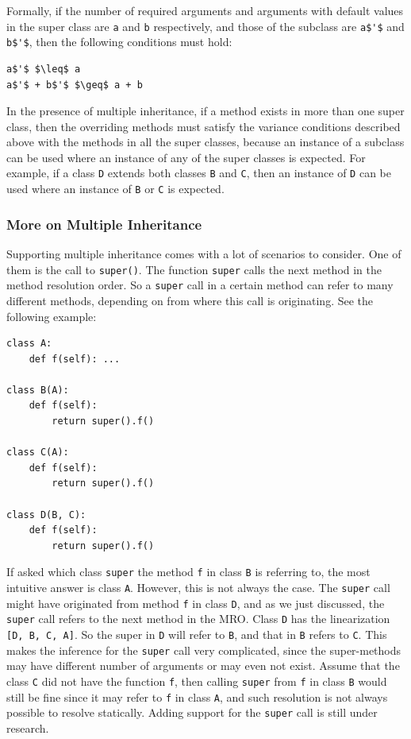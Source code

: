 Formally, if the number of required arguments and arguments with default values in the super class are \lstinline|a| and \lstinline|b| respectively, and those of the subclass are \lstinline[mathescape]|a$'$| and \lstinline[mathescape]|b$'$|, then the following conditions must hold:
\begin{lstlisting}[mathescape]
a$'$ $\leq$ a 
a$'$ + b$'$ $\geq$ a + b
\end{lstlisting}

In the presence of multiple inheritance, if a method exists in more than one super class, then the overriding methods must satisfy the variance conditions described above with the methods in all the super classes, because an instance of a subclass can be used where an instance of any of the super classes is expected. For example, if a class \lstinline|D| extends both classes \lstinline|B| and \lstinline|C|, then an instance of \lstinline|D| can be used where an instance of \lstinline|B| or \lstinline|C| is expected.

\subsubsection{More on Multiple Inheritance}
Supporting multiple inheritance comes with a lot of scenarios to consider. One of them is the call to \lstinline|super()|. The function \lstinline|super| calls the next method in the method resolution order. So a \lstinline|super| call in a certain method can refer to many different methods, depending on from where this call is originating. See the following example:
\begin{lstlisting}
class A:
	def f(self): ...
		
class B(A):
	def f(self):
		return super().f()
	
class C(A):
	def f(self):
		return super().f()

class D(B, C):
	def f(self):
		return super().f()
\end{lstlisting}

If asked which class \lstinline|super| the method \lstinline|f| in class \lstinline|B| is referring to, the most intuitive answer is class \lstinline|A|. However, this is not always the case. The \lstinline|super| call might have originated from method \lstinline|f| in class \lstinline|D|, and as we just discussed, the \lstinline|super| call refers to the next method in the MRO. Class \lstinline|D| has the linearization \lstinline|[D, B, C, A]|. So the super in \lstinline|D| will refer to \lstinline|B|, and that in \lstinline|B| refers to \lstinline|C|. This makes the inference for the \lstinline|super| call very complicated, since the super-methods may have different number of arguments or may even not exist. Assume that the class \lstinline|C| did not have the function \lstinline|f|, then calling \lstinline|super| from \lstinline|f| in class \lstinline|B| would still be fine since it may refer to \lstinline|f| in class \lstinline|A|, and such resolution is not always possible to resolve statically. Adding support for the \lstinline|super| call is still under research.\\


